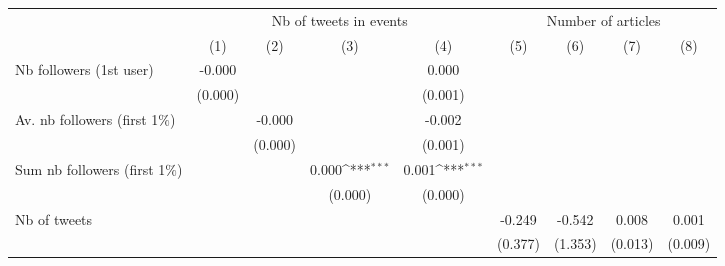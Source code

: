 {
\def\sym#1{\ifmmode^{#1}\else\(^{#1}\)\fi}
\begin{tabular}{l*{8}{c}}
\hline\hline
                    &\multicolumn{4}{c}{Nb of tweets in events}                                             &\multicolumn{4}{c}{Number of articles}                                                 \\\cmidrule(lr){2-5}\cmidrule(lr){6-9}
                    &\multicolumn{1}{c}{(1)}         &\multicolumn{1}{c}{(2)}         &\multicolumn{1}{c}{(3)}         &\multicolumn{1}{c}{(4)}         &\multicolumn{1}{c}{(5)}         &\multicolumn{1}{c}{(6)}         &\multicolumn{1}{c}{(7)}         &\multicolumn{1}{c}{(8)}         \\
\hline
Nb followers (1st user)&      -0.000         &                     &                     &       0.000         &                     &                     &                     &                     \\
                    &     (0.000)         &                     &                     &     (0.001)         &                     &                     &                     &                     \\
Av. nb followers (first 1$\%$)&                     &      -0.000         &                     &      -0.002         &                     &                     &                     &                     \\
                    &                     &     (0.000)         &                     &     (0.001)         &                     &                     &                     &                     \\
Sum nb followers (first 1$\%$)&                     &                     &       0.000\sym{***}&       0.001\sym{***}&                     &                     &                     &                     \\
                    &                     &                     &     (0.000)         &     (0.000)         &                     &                     &                     &                     \\
Nb of tweets        &                     &                     &                     &                     &      -0.249         &      -0.542         &       0.008         &       0.001         \\
                    &                     &                     &                     &                     &     (0.377)         &     (1.353)         &     (0.013)         &     (0.009)         \\

\end{tabular}}
